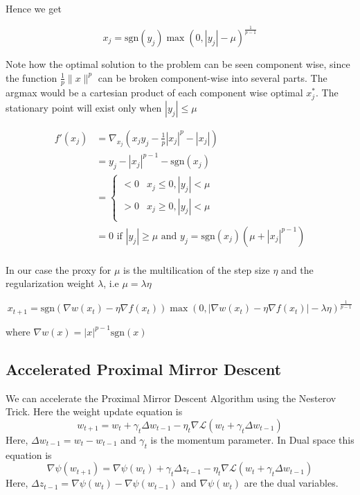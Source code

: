 Hence we get 

$$
    x_j = \text{sgn}(y_j) \max(0, |y_j| - \mu)^{\frac{1}{p-1}}
$$

Note how the optimal solution to the problem can be seen component wise, since the function $\frac{1}{p} \| x \|^p$ can be broken component-wise into several parts.
The argmax would be a cartesian product of each component wise optimal $x_j^*$. The stationary point will exist only when $|y_j| \le \mu$


\begin{align*}
    f'(x_j) &= \nabla_{x_j} (x_jy_j  - \frac{1}{p} |x_j|^p - |x_j|) \\\
    &= y_j - |x_j|^{p-1} - \text{sgn}(x_j) \\
    &= \begin{cases} 
        < 0 & x_j\leq 0, |y_j| < \mu \\
        > 0  & x_j \geq 0, |y_j| < \mu  \\
     \end{cases}\\
    &= 0 \text{ if } |y_j| \ge \mu \text{ and } y_j = \text{sgn}(x_j) ( \mu + |x_j|^{p-1})\\
\end{align*}

In our case the proxy for $\mu$ is the multilication of the step size $\eta$ and the regularization weight $\lambda$, i.e $\mu = \lambda \eta$

\begin{equation}
    \label{eq: psmd}
    x_{t + 1} = \text{sgn}(\nabla w(x_t) - \eta \nabla f(x_t)) \max(0, |\nabla w(x_t) - \eta \nabla f(x_t)| - \lambda \eta)^{\frac{1}{p-1}}
\end{equation}

where $\nabla w(x) = |x|^{p-1} \text{sgn}(x)$

\subsection*{Accelerated Proximal Mirror Descent}

We can accelerate the Proximal Mirror Descent Algorithm using the Nesterov Trick. Here the weight update equation is
\begin{equation}
w_{t+1} = w_t + \gamma_t \Delta w_{t-1} -\eta_t \nabla \mathcal{L}(w_t+\gamma_t\Delta w_{t-1})
\end{equation}
Here, $\Delta w_{t-1} = w_t-w_{t-1}$ and $\gamma_t$ is the momentum parameter. In Dual space this equation is 
\begin{equation}
\nabla \psi(w_{t+1}) = \nabla \psi(w_t) + \gamma_t\Delta z_{t-1} - \eta_t \nabla\mathcal{L}(w_t+\gamma_t \Delta w_{t-1})
\end{equation} 
Here, $\Delta z_{t-1} = \nabla \psi(w_t)-\nabla \psi(w_{t-1})$ and $\nabla \psi(w_t)$ are the dual variables.

